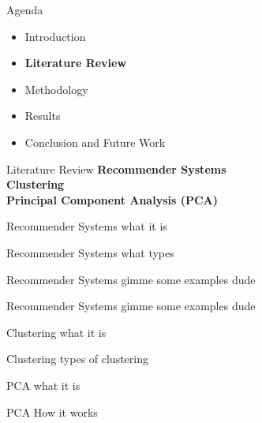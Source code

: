 \begin{frame}{Agenda}
\begin{itemize}
    \item Introduction
    \item \textbf{Literature Review}
    \item Methodology
    \item Results
    \item Conclusion and Future Work
\end{itemize}
\end{frame}


\begin{frame}{Literature Review}
    \textbf{Recommender Systems\\}
    \vspace{0.5cm}
    \textbf{Clustering\\}
    \vspace{0.5cm}
    \textbf{Principal Component Analysis (PCA)}
\end{frame}


\begin{frame}{Recommender Systems}
    what it is
\end{frame}


\begin{frame}{Recommender Systems}
    what types
\end{frame}


\begin{frame}{Recommender Systems}
    gimme some examples dude
\end{frame}


\begin{frame}{Recommender Systems}
    gimme some examples dude
\end{frame}


\begin{frame}{Clustering}
    what it is
\end{frame}


\begin{frame}{Clustering}
    types of clustering
\end{frame}


\begin{frame}{PCA}
    what it is
\end{frame}

%

\begin{frame}{PCA}
    How it works
\end{frame}